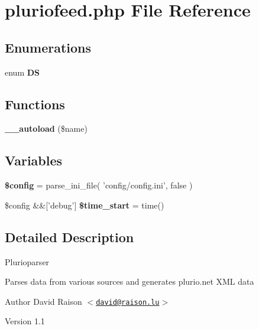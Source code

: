 \hypertarget{pluriofeed_8php}{
\section{pluriofeed.php File Reference}
\label{pluriofeed_8php}
}
\subsection*{Enumerations}
\begin{DoxyCompactItemize}
\item 
enum {\bfseries DS} 
\end{DoxyCompactItemize}
\subsection*{Functions}
\begin{DoxyCompactItemize}
\item 
\hypertarget{pluriofeed_8php_a000212e6a7ce31b085f4f74c48ceabc5}{
{\bfseries \_\-\_\-autoload} (\$name)}
\label{pluriofeed_8php_a000212e6a7ce31b085f4f74c48ceabc5}

\end{DoxyCompactItemize}
\subsection*{Variables}
\begin{DoxyCompactItemize}
\item 
\hypertarget{pluriofeed_8php_a49c7011be9c979d9174c52a8b83e5d8e}{
{\bfseries \$config} = parse\_\-ini\_\-file( 'config/config.ini', false )}
\label{pluriofeed_8php_a49c7011be9c979d9174c52a8b83e5d8e}

\item 
\hypertarget{pluriofeed_8php_a9ccb5b24d776d50f8d413e3e53a44765}{
\$config \&\&\mbox{[}'debug'\mbox{]} {\bfseries \$time\_\-start} = time()}
\label{pluriofeed_8php_a9ccb5b24d776d50f8d413e3e53a44765}

\end{DoxyCompactItemize}


\subsection{Detailed Description}
Plurioparser

Parses data from various sources and generates plurio.net XML data

\begin{DoxyAuthor}{Author}
David Raison $<$\href{mailto:david@raison.lu}{\tt david@raison.lu}$>$
\end{DoxyAuthor}
\begin{DoxyVersion}{Version}
1.1 
\end{DoxyVersion}
